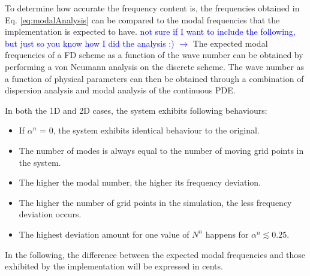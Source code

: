 \documentclass[fleqn]{jaes}
\def\SWcomment[#1]{\textcolor{blue}{#1}}
\begin{document}
To determine how accurate the frequency content is, the frequencies obtained in Eq. \eqref{eq:modalAnalysis} can be compared to the modal frequencies that the implementation is expected to have. \SWcomment[not sure if I want to include the following, but just so you know how I did the analysis :) $\rightarrow$]
The expected modal frequencies of a FD scheme as a function of the wave number can be obtained by performing a von Neumann analysis on the discrete scheme. The wave number as a function of physical parameters can then be obtained through a combination of dispersion analysis and modal analysis of the continuous PDE. 


In both the 1D and 2D cases, the system exhibits following behaviours:
\begin{itemize}
    \item If $\alpha^n$ = 0, the system exhibits identical behaviour to the original. 
    \item The number of modes is always equal to the number of moving grid points in the system.
    \item The higher the modal number, the higher its frequency deviation.
    \item The higher the number of grid points in the simulation, the less frequency deviation occurs.
    \item The highest deviation amount for one value of $N^n$ happens for $\alpha^n \lesssim 0.25$.
\end{itemize}

In the following, the difference between the expected modal frequencies and those exhibited by the implementation will be expressed in cents.

\end{document}
